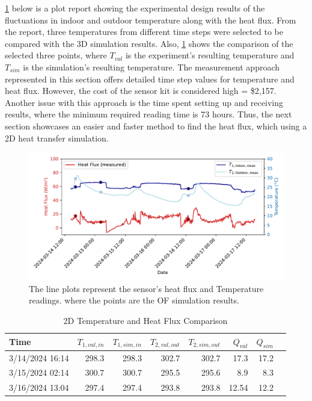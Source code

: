 \ref{fig:expr} below is a plot report showing the experimental design results of the fluctuations in indoor and outdoor temperature along with the heat flux. From the report, three temperatures from different time steps were selected to be compared with the 3D simulation results. Also, \ref{table2d} shows the comparison of the selected three points, where $T_{val}$ is the experiment's resulting temperature and $T_{sim}$ is the simulation's resulting temperature. 
The measurement approach represented in this section offers detailed time step values for temperature and heat flux. However, the cost of the sensor kit is considered high = \$2,157. Another issue with this approach is the time spent setting up and receiving results, where the minimum required reading time is 73 hours. Thus, the next section showcases an easier and faster method to find the heat flux, which using a 2D heat transfer simulation.

\begin{figure}[htb]
     \centering
    \includegraphics[width=1\linewidth]{Figures/Validation}
     \caption[2D Experimental Report Plot]{The line plots represent the sensor's heat flux and Temperature readings. where the points are the \gls{OF} simulation results.}
   \label{fig:expr}
 \end{figure}


\begin{table}[tbh]
    \caption{2D Temperature and Heat Flux Comparison}
    \label{table2d}
    \centering
    \begin{tabular}{lrrrrrrr}
        \toprule
        Time                & $T_{1,val,in}$ & $T_{1,sim,in}$ & $T_{2,val,out}$& $T_{2,sim,out}$ & $Q_{val}$ & $Q_{sim}$ \\
        \midrule
        3/14/2024 16:14 & 298.3    & 298.3    & 302.7     & 302.7     & 17.3 & 17.2 \\
        3/15/2024 02:14  & 300.7    & 300.7   & 295.5    & 295.6     & 8.9  & 8.3  \\
        3/16/2024 13:04 & 297.4  & 297.4   & 293.8   & 293.8   & 12.54 & 12.2  \\
        \bottomrule
    \end{tabular}
   
\end{table}




